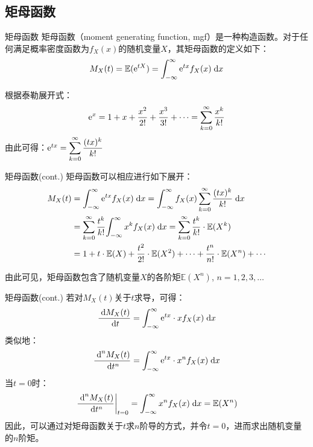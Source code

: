 \documentclass[t]{beamer}
\newcommand{\dif}{{\;\rm d}}
\newcommand{\E}{\mathbb{E}}
\begin{document}
  \subsection{矩母函数}

  \begin{frame}{矩母函数}
    矩母函数（moment generating function,
    mgf）是一种构造函数。对于任何满足概率密度函数为$f_X(x)$的随机变量$X$，其矩母函数的定义如下：
    \begin{equation*}
    M_X(t)=\E({\rm e}^{tX})=\int^{\infty}_{-\infty}{\rm
    e}^{tx}f_X(x)\dif x \end{equation*}
  
    根据泰勒展开式：
\begin{equation*}
{\rm
e}^x=1+x+\frac{x^2}{2!}+\frac{x^3}{3!}+\cdots=\sum^{\infty}_{k=0}\frac{x^k}{k!}
\end{equation*}
由此可得：${\rm e}^{tx}=\displaystyle\sum^{\infty}_{k=0}\frac{(tx)^k}{k!}$
  \end{frame}


  \begin{frame}{矩母函数(cont.)}
    矩母函数可以相应进行如下展开：
    \begin{equation*}\begin{split}
    M_X(t)&=\int^{\infty}_{-\infty}{\rm e}^{tx}f_X(x)\dif x
    =\int^{\infty}_{-\infty}f_X(x)\sum^{\infty}_{k=0}\frac{(tx)^k}{k!}\dif
    x \\
    &=\sum^{\infty}_{k=0}
    \frac{t^k}{k!}{\int^{\infty}_{-\infty}x^kf_X(x)\dif
    x}=\sum^{\infty}_{k=0} \frac{t^k}{k!}\cdot{\E(X^k)}\\
    &=1+t\cdot
    {\E(X)}+\frac{t^2}{2!}\cdot{\E(X^2)}+\cdots+\frac{t^n}{n!}\cdot{\E(X^n)}+\cdots
    \end{split}
    \end{equation*}
  
    由此可见，矩母函数包含了随机变量$X$的各阶矩$\E(X^n)$, $n=1,2,3,\ldots$
  \end{frame}
  
  \begin{frame}{矩母函数(cont.)}
    若对$M_X(t)$关于$t$求导，可得：
    \begin{equation*}\frac{\dif M_X(t)}{\dif
    t}=\int^{\infty}_{-\infty}{\rm e}^{tx}\cdot xf_X(x)\dif x
    \end{equation*}
    类似地：
    $$\frac{\dif^{n} M_X(t)}{\dif t^n}=\int^{\infty}_{-\infty}{\rm
    e}^{tx}\cdot x^nf_X(x)\dif x$$
    当$t=0$时：
    \begin{equation*}{\left.\frac{\dif^{n} M_X(t)}{\dif
    t^n}\right|_{t=0}}=\int^{\infty}_{-\infty} x^nf_X(x)\dif
    x=\E(X^n) \end{equation*}
    因此，可以通过对矩母函数关于$t$求$n$阶导的方式，并令$t=0$，进而求出随机变量的$n$阶矩。
  
  \end{frame}
\end{document}
